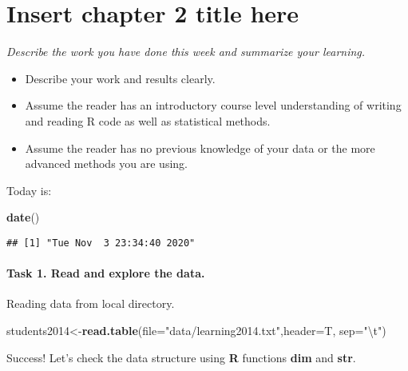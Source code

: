 \documentclass[
]{article}
\author{}
\date{\vspace{-2.5em}}
\newenvironment{Shaded}{\begin{snugshade}}{\end{snugshade}}
\newcommand{\CharTok}[1]{\textcolor[rgb]{0.31,0.60,0.02}{#1}}
\newcommand{\DataTypeTok}[1]{\textcolor[rgb]{0.13,0.29,0.53}{#1}}
\newcommand{\KeywordTok}[1]{\textcolor[rgb]{0.13,0.29,0.53}{\textbf{#1}}}
\newcommand{\NormalTok}[1]{#1}
\newcommand{\StringTok}[1]{\textcolor[rgb]{0.31,0.60,0.02}{#1}}
\providecommand{\tightlist}{%
  \setlength{\itemsep}{0pt}\setlength{\parskip}{0pt}}
\begin{document}
\hypertarget{insert-chapter-2-title-here}{%
\section{Insert chapter 2 title
here}\label{insert-chapter-2-title-here}}

\emph{Describe the work you have done this week and summarize your
learning.}

\begin{itemize}
\tightlist
\item
  Describe your work and results clearly.
\item
  Assume the reader has an introductory course level understanding of
  writing and reading R code as well as statistical methods.
\item
  Assume the reader has no previous knowledge of your data or the more
  advanced methods you are using.
\end{itemize}

Today is:

\begin{Shaded}
\begin{Highlighting}[]
\KeywordTok{date}\NormalTok{()}
\end{Highlighting}
\end{Shaded}

\begin{verbatim}
## [1] "Tue Nov  3 23:34:40 2020"
\end{verbatim}

\hypertarget{task-1.-read-and-explore-the-data.}{%
\paragraph{Task 1. Read and explore the
data.}\label{task-1.-read-and-explore-the-data.}}

Reading data from local directory.

\begin{Shaded}
\begin{Highlighting}[]
\NormalTok{students2014<-}\KeywordTok{read.table}\NormalTok{(}\DataTypeTok{file=}\StringTok{"data/learning2014.txt"}\NormalTok{,}\DataTypeTok{header=}\NormalTok{T, }\DataTypeTok{sep=}\StringTok{"}\CharTok{\textbackslash{}t}\StringTok{"}\NormalTok{)}
\end{Highlighting}
\end{Shaded}

Success! Let's check the data structure using \textbf{R} functions
\textbf{dim} and \textbf{str}.
\end{document}

